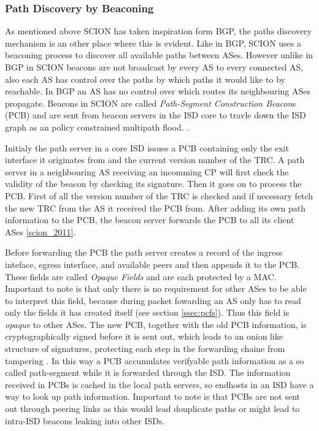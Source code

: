 \documentclass[../eva1_scion.tex]{subfiles}
\begin{document}
    \subsubsection{Path Discovery by Beaconing}\label{ssec:beaconing}
    As mentioned above SCION has taken inspiration form BGP, the paths discovery mechanism is an other place where this is evident. Like in BGP, SCION uses a beaconing process to discover all available paths between ASes. However unlike in BGP in SCION beacons are not broadcast by every AS to every connected AS, also each AS has control over the paths by which paths it would like to by reachable. In BGP an AS has no control over which routes its neighbouring ASes propagate. Beacons in SCION are called \textit{Path-Segment Construction Beacon}s (PCB) and are  sent from beacon servers in the ISD core to travle down the ISD graph as an policy constrained multipath flood. \cite{scion_2011}.

    Initialy the path server in a core ISD issues a PCB containing only the exit interface it originates from and the current version number of the TRC. A path server in a neighbouring AS receiving an incomming CP will first check the validity of the beacon by checking its signature. Then it goes on to process the PCB. First of all the version number of the TRC is checked and if necessary fetch the new TRC from the AS it received the PCB from. After adding its own path information to the PCB, the beacon server forwards the PCB to all its client ASes \ref{scion_2011}.

    Before forwarding the PCB the path server creates a record of the ingress inteface, egress interface, and available peers and then appends it to the PCB. These fields are called \textit{Opaque Fields} and are each protected by a MAC. Important to note is that only there is no requirement for other ASes to be able to interpret this field, because during packet fowarding an AS only has to read only the fields it has created itself (see section \ref{ssec:pcfs}). Thus this field is \textit{opaque} to other ASes. The new PCB, together with the old PCB information, is cryptographically signed before it is sent out, which leads to an onion like structure of signatures, protecting each step in the forwarding chaine from tampering \cite{scion_2011}. In this way a PCB accumulates verifyable path information as a so called path-segment while it is forwarded through the ISD. The information received in PCBs is cached in the local path servers, so endhosts in an ISD have a way to look up path information. Important to note is that PCBs are not sent out through peering links as this would lead douplicate paths or might lead to intra-ISD beacons leaking into other ISDs.
\end{document}
